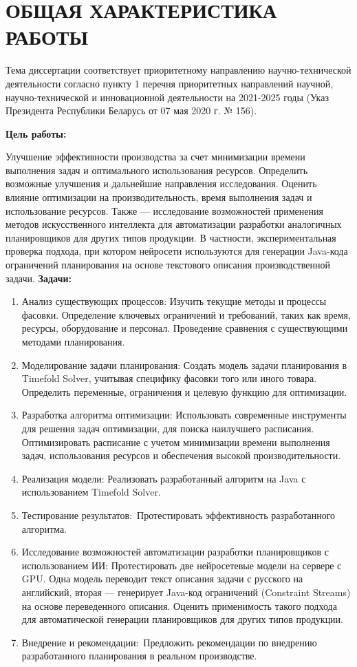 \chapter*{ОБЩАЯ ХАРАКТЕРИСТИКА РАБОТЫ}
\label{ch:target}

Тема диссертации соответствует приоритетному направлению научно-технической деятельности согласно пункту 1 перечня приоритетных направлений научной, научно-технической и инновационной деятельности на 2021-2025 годы (Указ Президента Республики Беларусь от 07 мая 2020 г. № 156).

\medskip  %
\bigskip  %

\noindent \textbf{Цель работы:}

Улучшение эффективности производства за счет минимизации времени выполнения задач и оптимального использования ресурсов. Определить возможные улучшения и дальнейшие направления исследования. Оценить влияние оптимизации на производительность, время выполнения задач и использование ресурсов.
Также — исследование возможностей применения методов искусственного интеллекта для автоматизации разработки аналогичных планировщиков для других типов продукции. В частности, экспериментальная проверка подхода, при котором нейросети используются для генерации Java-кода ограничений планирования на основе текстового описания производственной задачи.
\noindent \textbf{Задачи:}
\begin{enumerate}
    \item Анализ существующих процессов:
Изучить текущие методы и процессы фасовки.
Определение ключевых ограничений и требований, таких как время, ресурсы, оборудование и персонал. Проведение сравнения с существующими методами планирования.
    \item  Моделирование задачи планирования:
Создать модель задачи планирования в Timefold Solver, учитывая специфику фасовки того или иного товара. Определить переменные, ограничения и целевую функцию для оптимизации.
    \item Разработка алгоритма оптимизации:
Использовать современные инструменты для решения задач оптимизации, для поиска наилучшего расписания.
Оптимизировать расписание с учетом минимизации времени выполнения задач, использования ресурсов и обеспечения высокой производительности.
    \item Реализация модели:
Реализовать разработанный алгоритм на Java с использованием Timefold Solver.
    \item Тестирование результатов:\
Протестировать эффективность разработанного алгоритма.
\item Исследование возможностей автоматизации разработки планировщиков с использованием ИИ:  
Протестировать две нейросетевые модели на сервере с GPU.  
Одна модель переводит текст описания задачи с русского на английский, вторая — генерирует Java-код ограничений (Constraint Streams) на основе переведенного описания.  
Оценить применимость такого подхода для автоматической генерации планировщиков для других типов продукции.
\item Внедрение и рекомендации:\
Предложить рекомендации по внедрению разработанного планирования в реальном производстве.
\end{enumerate}

